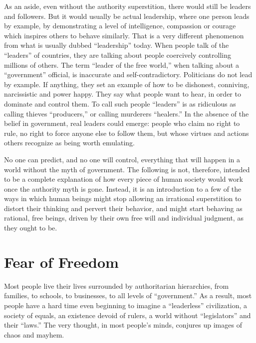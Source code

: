 \documentclass{book}
\begin{document}
As an aside, even without the authority superstition, there would still be leaders and followers. But it would usually be actual leadership, where one person leads by example, by demonstrating a level of intelligence, compassion or courage which inspires others to behave similarly. That is a very different phenomenon from what is usually dubbed \enquote{leadership} today. When people talk of the \enquote{leaders} of countries, they are talking about people coercively controlling millions of others. The term \enquote{leader of the free world,} when talking about a \enquote{government} official, is inaccurate and self-contradictory. Politicians do not lead by example. If anything, they set an example of how to be dishonest, conniving, narcissistic and power happy. They say what people want to hear, in order to dominate and control them. To call such people \enquote{leaders} is as ridiculous as calling thieves \enquote{producers,} or calling murderers \enquote{healers.} In the absence of the belief in government, real leaders could emerge: people who claim no right to rule, no right to force anyone else to follow them, but whose virtues and actions others recognize as being worth emulating.

No one can predict, and no one will control, everything that will happen in a world without the myth of government. The following is not, therefore, intended to be a complete explanation of how every piece of human society would work once the authority myth is gone. Instead, it is an introduction to a few of the ways in which human beings might stop allowing an irrational superstition to distort their thinking and pervert their behavior, and might start behaving as rational, free beings, driven by their own free will and individual judgment, as they ought to be.

\section{Fear of Freedom}

Most people live their lives surrounded by authoritarian hierarchies, from families, to schools, to businesses, to all levels of \enquote{government.} As a result, most people have a hard time even beginning to imagine a \enquote{leaderless} civilization, a society of equals, an existence devoid of rulers, a world without \enquote{legislators} and their \enquote{laws.} The very thought, in most people's minds, conjures up images of chaos and mayhem.
\end{document}
